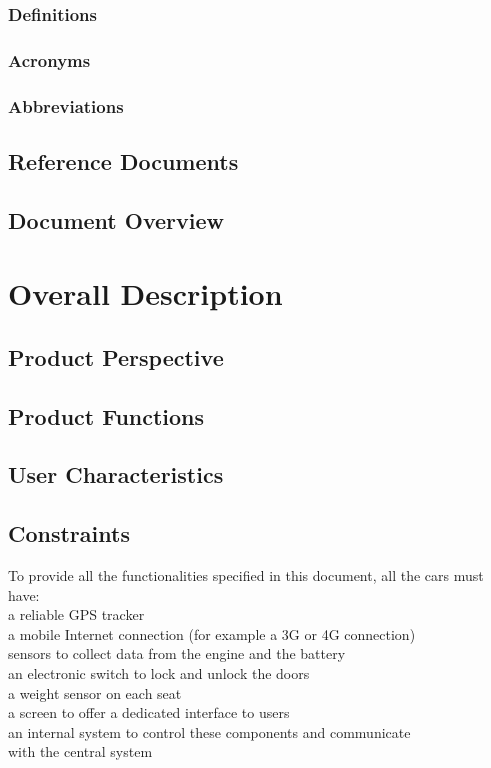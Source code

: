 \documentclass[english]{article}
\begin{document}
\subsubsection{Definitions}

\subsubsection{Acronyms}

\subsubsection{Abbreviations}

\subsection{Reference Documents}

\subsection{Document Overview}

\newpage{}

\section{Overall Description}

\subsection{Product Perspective}

\subsection{Product Functions}

\subsection{User Characteristics}

\subsection{Constraints}

To provide all the functionalities specified in this document, all the cars must have:\\
a reliable GPS tracker\\
a mobile Internet connection (for example a 3G or 4G connection)\\
sensors to collect data from the engine and the battery\\
an electronic switch to lock and unlock the doors\\
a weight sensor on each seat\\
a screen to offer a dedicated interface to users\\
an internal system to control these components and communicate\\ with the central system\\
\end{document}
